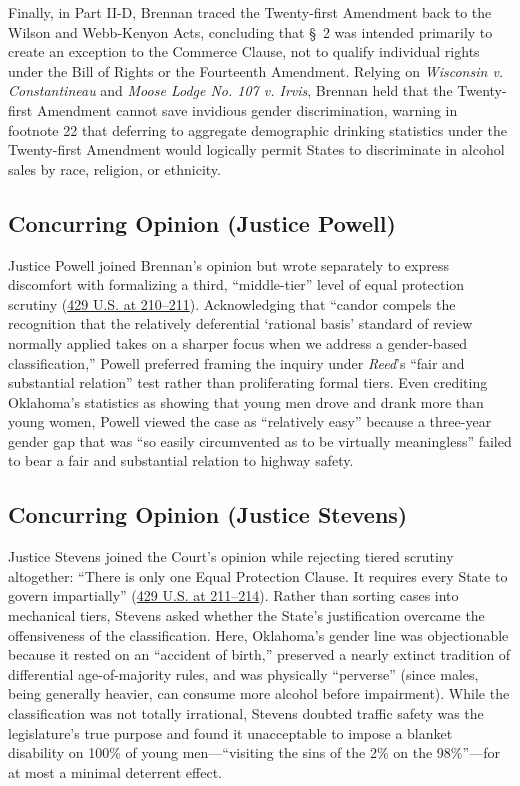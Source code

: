 \documentclass[12pt]{article}
\begin{document}
Finally, in Part II-D, Brennan traced the Twenty-first Amendment back to the Wilson and Webb-Kenyon Acts, concluding that \S\ 2 was intended primarily to create an exception to the Commerce Clause, not to qualify individual rights under the Bill of Rights or the Fourteenth Amendment. Relying on \textit{Wisconsin v. Constantineau} and \textit{Moose Lodge No. 107 v. Irvis}, Brennan held that the Twenty-first Amendment cannot save invidious gender discrimination, warning in footnote 22 that deferring to aggregate demographic drinking statistics under the Twenty-first Amendment would logically permit States to discriminate in alcohol sales by race, religion, or ethnicity.

\subsection{Concurring Opinion (Justice Powell)}

Justice Powell joined Brennan's opinion but wrote separately to express discomfort with formalizing a third, ``middle-tier'' level of equal protection scrutiny (\href{https://supreme.justia.com/cases/federal/us/429/190/}{429 U.S. at 210--211}). Acknowledging that ``candor compels the recognition that the relatively deferential `rational basis' standard of review normally applied takes on a sharper focus when we address a gender-based classification,'' Powell preferred framing the inquiry under \textit{Reed}'s ``fair and substantial relation'' test rather than proliferating formal tiers. Even crediting Oklahoma's statistics as showing that young men drove and drank more than young women, Powell viewed the case as ``relatively easy'' because a three-year gender gap that was ``so easily circumvented as to be virtually meaningless'' failed to bear a fair and substantial relation to highway safety.

\subsection{Concurring Opinion (Justice Stevens)}

Justice Stevens joined the Court's opinion while rejecting tiered scrutiny altogether: ``There is only one Equal Protection Clause. It requires every State to govern impartially'' (\href{https://supreme.justia.com/cases/federal/us/429/190/}{429 U.S. at 211--214}). Rather than sorting cases into mechanical tiers, Stevens asked whether the State's justification overcame the offensiveness of the classification. Here, Oklahoma's gender line was objectionable because it rested on an ``accident of birth,'' preserved a nearly extinct tradition of differential age-of-majority rules, and was physically ``perverse'' (since males, being generally heavier, can consume more alcohol before impairment). While the classification was not totally irrational, Stevens doubted traffic safety was the legislature's true purpose and found it unacceptable to impose a blanket disability on 100\% of young men---``visiting the sins of the 2\% on the 98\%''---for at most a minimal deterrent effect.
\end{document}
